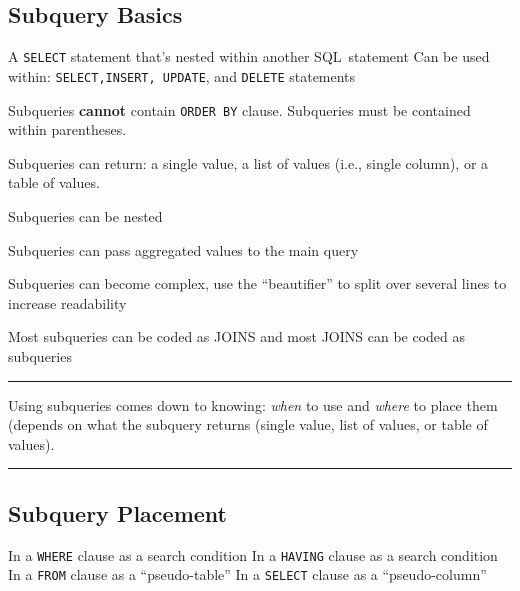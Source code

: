 \documentclass{article}
\begin{document}
 
  
  
  

\subsection*{Subquery Basics}


\begin{outline}
\1 A \texttt{SELECT} statement that's nested within another SQL\ statement
        \2 Can be used within: \texttt{SELECT,INSERT, UPDATE}, and \texttt{DELETE}
statements

\1 Subqueries \textbf{cannot} contain \texttt{ORDER BY} clause. 
\1 Subqueries must be contained within parentheses.    

\1 Subqueries can return:
        \2  a single value,  
        \2 a list of values (i.e., single column), or 
        \2 a table of values.  

\1 Subqueries can be nested

\1Subqueries can pass aggregated values to the main query

\1 Subqueries can become complex, use the ``beautifier'' to split over several lines to increase readability

\1 Most subqueries can be coded as JOINS and most JOINS can be coded as subqueries

 \end{outline}

\hspace{-0.5cm}\rule[0.101in]{\textwidth}{0.0025in}
% 

\noindent Using subqueries comes down to knowing: \textit{when} to use and \textit{where} to place them (depends on what the subquery returns (single value, list of values, or table of values).   






\hspace{-0.5cm}\rule[-0.101in]{\textwidth}{0.0025in}
    
  
  


\subsection*{Subquery Placement}
\begin{outline}
 
    \1 In a \texttt{WHERE} clause as a search condition
    \1 In a \texttt{HAVING} clause as a search condition 
    \1 In a \texttt{FROM} clause as a ``pseudo-table''
    \1 In a \texttt{SELECT} clause as a ``pseudo-column''
\end{outline}
\end{document}
